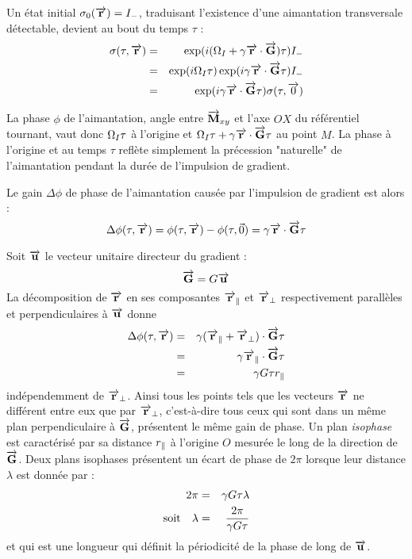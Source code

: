 Un état initial $\sigma_0(\overrightarrow{\mathbf{r}}) = I_-$, traduisant l'existence
d'une aimantation transversale détectable, devient au bout du temps $\tau$ :
\begin{eqnarray}
\sigma(\tau,\overrightarrow{\mathbf{r}}) & = & \exp(i(\Omega_I + \gamma\overrightarrow{\mathbf{r}}\cdot\overrightarrow{\mathbf{G}})\tau) I_- \\
& = & \exp(i\Omega_I\tau) \exp(i\gamma\overrightarrow{\mathbf{r}}\cdot\overrightarrow{\mathbf{G}}\tau) I_- \\
& = & \exp(i\gamma\overrightarrow{\mathbf{r}}\cdot\overrightarrow{\mathbf{G}}\tau) \sigma(\tau, \overrightarrow{0})
\end{eqnarray}

La phase $\phi$ de l'aimantation, angle entre $\overrightarrow{\mathbf{M}}_{xy}$ et l'axe $OX$
du référentiel tournant, vaut donc $\Omega_I\tau$ à l'origine et
$\Omega_I\tau + \gamma\overrightarrow{\mathbf{r}}\cdot\overrightarrow{\mathbf{G}}\tau$ au point $M$.
La phase à l'origine et au temps $\tau$ reflète simplement la précession "naturelle"
de l'aimantation pendant la durée de l'impulsion de gradient.

Le gain $\Delta\phi$ de phase de l'aimantation causée par l'impulsion de gradient est alors :
\begin{equation}
\Delta\phi(\tau,\overrightarrow{\mathbf{r}}) = \phi(\tau,\overrightarrow{\mathbf{r}}) - \phi(\tau,\vec{0}) = \gamma\overrightarrow{\mathbf{r}}\cdot\overrightarrow{\mathbf{G}}\tau
\end{equation}

Soit $\overrightarrow{\mathbf{u}}$ le vecteur unitaire directeur du gradient :
\begin{equation}
\overrightarrow{\mathbf{G}} = G\overrightarrow{\mathbf{u}}
\end{equation}
La décomposition de $\overrightarrow{\mathbf{r}}$ en ses composantes $\overrightarrow{\mathbf{r}}_{\|}$ et $\overrightarrow{\mathbf{r}}_{\bot}$
respectivement parallèles et perpendiculaires à $\overrightarrow{\mathbf{u}}$ donne
\begin{eqnarray}
\Delta\phi(\tau,\overrightarrow{\mathbf{r}}) & = & \gamma(\overrightarrow{\mathbf{r}}_{\|} + \overrightarrow{\mathbf{r}}_{\bot})\cdot\overrightarrow{\mathbf{G}}\tau \\
& = & \gamma\overrightarrow{\mathbf{r}}_{\|}\cdot\overrightarrow{\mathbf{G}}\tau \\
& = & \gamma G\tau r_{\|}
\end{eqnarray}
indépendemment de $\overrightarrow{\mathbf{r}}_{\bot}$. 
Ainsi tous les points tels que les vecteurs $\overrightarrow{\mathbf{r}}$ ne différent entre eux
que par $\overrightarrow{\mathbf{r}}_{\bot}$, c'est-à-dire tous
ceux qui sont dans un même plan perpendiculaire à $\overrightarrow{\mathbf{G}}$,
présentent le même gain de phase.
Un plan \emph{isophase} est caractérisé par sa distance $r_{\|}$ à l'origine $O$ mesurée 
le long de la direction de $\overrightarrow{\mathbf{G}}$.
Deux plans isophases présentent un écart de phase de $2\pi$ lorsque leur
distance $\lambda$ est donnée par :
\begin{eqnarray}
2\pi & = & \gamma G\tau\lambda \\
\mbox{soit}\quad\lambda & = & \frac{2\pi}{\gamma G\tau}
\end{eqnarray}
et qui est une longueur qui définit la périodicité de la phase
de long de $\overrightarrow{\mathbf{u}}$.

